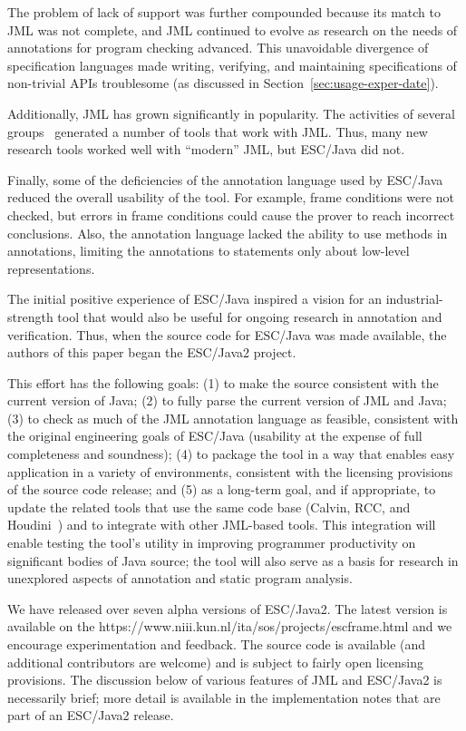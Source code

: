 \documentclass{llncs}
\begin{document}
The problem of lack of support was further compounded because its
match to JML was not complete, and JML continued to evolve as research
on the needs of annotations for program checking advanced.  This
unavoidable divergence of specification languages made writing,
verifying, and maintaining specifications of non-trivial APIs
troublesome (as discussed in Section~\ref{sec:usage-exper-date}).

Additionally, JML has grown significantly in popularity.  The
activities of several
groups~\cite{jmlpapers,Burdy-etal03,Leavens-etal00,NimmerErnst01,Bogor03}
generated a number of tools that work with JML.  Thus, many new
research tools worked well with ``modern'' JML, but ESC/Java did not.

Finally, some of the deficiencies of the annotation language used by
ESC/Java reduced the overall usability of the tool.  For example,
frame conditions were not checked, but errors in frame conditions
could cause the prover to reach incorrect conclusions.  Also, the
annotation language lacked the ability to use methods in annotations,
limiting the annotations to statements only about low-level
representations.

The initial positive experience of ESC/Java inspired a vision for an
industrial-strength tool that would also be useful for ongoing
research in annotation and verification.  Thus, when the source code
for ESC/Java was made available, the authors of this paper began the
ESC/Java2 project.

This effort has the following goals:
(1) to make the source consistent with the current version of Java;
(2) to fully parse the current version of JML and Java;
(3) to check as much of the JML annotation language as feasible,
consistent with the original engineering goals of ESC/Java
(usability at the expense of full completeness and soundness);
(4) to package the tool in a way that enables easy application in a
variety of environments, consistent with the licensing provisions of
the source code release; and
(5) as a long-term goal, and if appropriate, to update the related
tools that use the same code base (Calvin, RCC, and
Houdini~\cite{flanagan01houdini}) and to integrate with other
JML-based tools.  This integration will enable testing the tool's
utility in improving programmer productivity on significant bodies of
Java source; the tool will also serve as a basis for research in
unexplored aspects of annotation and static program analysis.
  
We have released over seven alpha versions of ESC/Java2.  The latest
version is available on the 
{https://www.niii.kun.nl/ita/sos/projects/escframe.html} and we
encourage experimentation and feedback.  The source code is available
(and additional contributors are welcome) and is subject to fairly
open licensing provisions.  The discussion below of various features
of JML and ESC/Java2 is necessarily brief; more detail is available in
the implementation notes that are part of an ESC/Java2 release.
\end{document}
